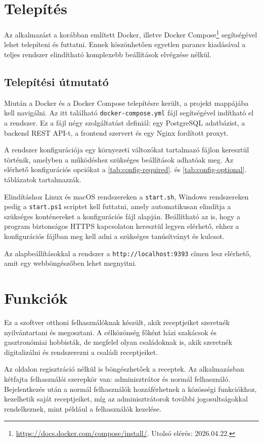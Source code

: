 \section{Telepítés}
Az alkalmazást a korábban említett Docker, illetve Docker Compose\footnote{\url{https://docs.docker.com/compose/install/}. Utolsó elérés: 2026.04.22.} segítségével lehet telepíteni és futtatni. Ennek köszönhetően egyetlen parancs kiadásával a teljes rendszer elindítható komplexebb beállítások elvégzése nélkül.

\subsection{Telepítési útmutató}
Miután a Docker és a Docker Compose telepítésre került, a projekt mappájába kell navigálni. Az itt található \texttt{docker-compose.yml} fájl segítségével indítható el a rendszer. Ez a fájl négy szolgáltatást definiál: egy PostgreSQL adatbázist, a backend REST API-t, a frontend szervert és egy Nginx fordított proxyt.

A rendszer konfigurációja egy környezeti változókat tartalmazó fájlon keresztül történik, amelyben a működéshez szükséges beállítások adhatóak meg. Az elérhető konfigurációs opciókat a \ref{tab:config-required}. és \ref{tab:config-optional}. táblázatok tartalmazzák.

Elindításhoz Linux és macOS rendszereken a \texttt{start.sh}, Windows rendszereken pedig a \texttt{start.ps1} scriptet kell futtatni, amely automatikusan elindítja a szükséges konténereket a konfigurációs fájl alapján. Beállítható az is, hogy a program biztonságos HTTPS kapcsolaton keresztül legyen elérhető, ehhez a konfigurációs fájlban meg kell adni a szükséges tanúsítványt és kulcsot.

Az alapbeállításokkal a rendszer a \texttt{http://localhost:9393} címen lesz elérhető, amit egy webböngészőben lehet megnyitni.

\section{Funkciók}
Ez a szoftver otthoni felhasználóknak készült, akik receptjeiket szeretnék nyilvántartani és megosztani. A célközönség főként házi szakácsok és gasztronómiai hobbisták, de megfelel olyan családoknak is, akik szeretnék digitalizálni és rendszerezni a családi receptjeiket.

Az oldalon regisztráció nélkül is böngészhetőek a receptek. Az alkalmazásban kétfajta felhasználói szerepkör van: adminisztrátor és normál felhasználó.  Bejelentkezés után a normál felhasználók hozzáférhetnek a közösségi funkciókhoz, kezelhetik saját receptjeiket, míg az adminisztrátorok további jogosultságokkal rendelkeznek, mint például a felhasználók kezelése.
